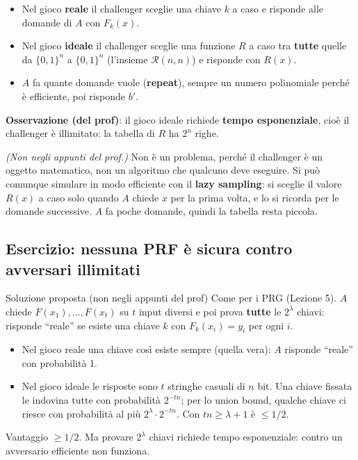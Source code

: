 \begin{itemize}
  \item Nel gioco \textbf{reale} il challenger sceglie una chiave \(k\) a caso e risponde alle domande di \(A\) con \(F_k(x)\).
  \item Nel gioco \textbf{ideale} il challenger sceglie una funzione \(R\) a caso tra \textbf{tutte} quelle da \(\{0,1\}^n\) a \(\{0,1\}^n\) (l'insieme \(\mathcal{R}(n, n)\)) e risponde con \(R(x)\).
  \item \(A\) fa quante domande vuole (\textbf{repeat}), sempre un numero polinomiale perché è efficiente, poi risponde \(b'\).
\end{itemize}

\textbf{Osservazione (del prof)}: il gioco ideale richiede \textbf{tempo esponenziale}, cioè il challenger è illimitato: la tabella di \(R\) ha \(2^n\) righe.

\begin{nota}
\emph{(Non negli appunti del prof.)} Non è un problema, perché il challenger è un oggetto matematico, non un algoritmo che qualcuno deve eseguire. Si può comunque simulare in modo efficiente con il \textbf{lazy sampling}: si sceglie il valore \(R(x)\) a caso solo quando \(A\) chiede \(x\) per la prima volta, e lo si ricorda per le domande successive. \(A\) fa poche domande, quindi la tabella resta piccola.
\end{nota}

\subsection{Esercizio: nessuna PRF è sicura contro avversari illimitati}

\begin{approfondimento}{Soluzione proposta (non negli appunti del prof)}
Come per i PRG (Lezione 5). \(A\) chiede \(F(x_1), \dots, F(x_t)\) su \(t\) input diversi e poi prova \textbf{tutte} le \(2^\lambda\) chiavi: risponde ``reale'' se esiste una chiave \(k\) con \(F_k(x_i) = y_i\) per ogni \(i\).
\begin{itemize}
  \item Nel gioco reale una chiave così esiste sempre (quella vera): \(A\) risponde ``reale'' con probabilità 1.
  \item Nel gioco ideale le risposte sono \(t\) stringhe casuali di \(n\) bit. Una chiave fissata le indovina tutte con probabilità \(2^{-tn}\); per lo union bound, qualche chiave ci riesce con probabilità al più \(2^\lambda \cdot 2^{-tn}\). Con \(t n \ge \lambda + 1\) è \(\le 1/2\).
\end{itemize}
Vantaggio \(\ge 1/2\). Ma provare \(2^\lambda\) chiavi richiede tempo esponenziale: contro un avversario efficiente non funziona.
\end{approfondimento}

